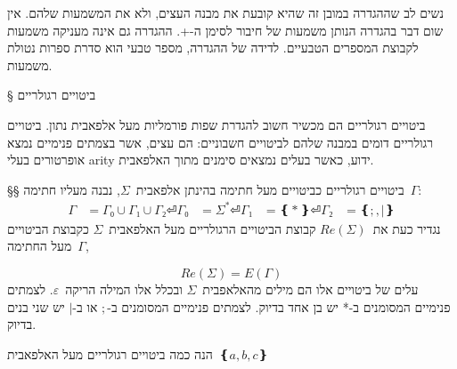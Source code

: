 \begin{figure}
  \centering
\end{figure}

נשים לב שההגדרה במובן זה שהיא קובעת את מבנה העצים, ולא את המשמעות שלהם. אין שום
דבר בהגדרה הנותן משמעות של חיבור לסימן ה-+. ההגדרה גם אינה מעניקה משמעות לקבוצת
המספרים הטבעיים. לדידה של ההגדרה, מספר טבעי הוא סדרת ספרות
נטולת משמעות.

§ ביטויים רגולריים

ביטויים רגולריים הם מכשיר חשוב להגדרת שפות פורמליות מעל אלפאבית נתון. ביטויים
רגולריים דומים במבנה שלהם לביטויים חשבוניים: הם עצים, אשר בצמתים פנימיים נמצא
אופרטורים בעלי arity ידוע, כאשר בעלים נמצאים סימנים מתוך האלפאבית.

§§ ביטויים רגולריים כביטויים מעל חתימה
בהינתן אלפאבית~$Σ$, נבנה מעליו חתימה~$Γ$:
\begin{equation}
  \begin{split}
    Γ &=Γ₀∪Γ₁∪Γ₂ ⏎
    Γ₀ &=Σ^* ⏎
    Γ₁ &=❴*❵ ⏎
    Γ₂ &=❴;,|❵
  \end{split}
\end{equation}
נגדיר כעת את~$Re(Σ)$ קבוצת הביטויים הרגולריים מעל האלפאבית~$Σ$ כקבוצת הביטויים מעל
החתימה~$Γ$,

\begin{equation}
  Re(Σ)=E(Γ)
\end{equation}
עלים של ביטויים אלו הם מילים מהאלאפבית~$Σ$ ובכלל אלו המילה הריקה~$ε$. לצמתים פנימיים המסומנים ב-* יש בן אחד בדיוק. לצמתים פנימיים המסומנים ב-$;$ או ב-$|$ יש שני בנים בדיוק.

הנה כמה ביטויים רגולריים מעל האלפאבית~$❴a,b,c❵$
\begin{figure}
  \centering
\end{figure}

